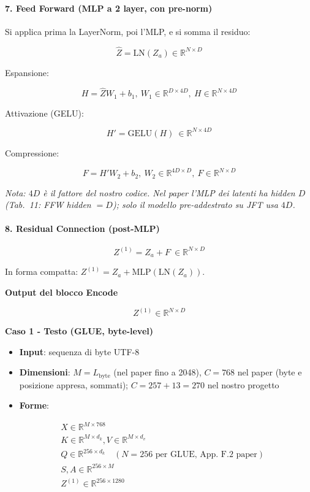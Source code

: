 \documentclass[
  11pt,
]{article}
\begin{document}
\paragraph{7. \textbf{Feed Forward (MLP a 2 layer, con pre-norm)}}

Si applica prima la LayerNorm, poi l'MLP, e si somma il residuo:

\[\widehat{Z} = \mathrm{LN}(Z_{a}) \in \mathbb{R}^{N \times D}\]

Espansione:

\[H = \widehat{Z}W_{1} + b_{1},\ W_{1} \in \mathbb{R}^{D \times 4D},\ H \in \mathbb{R}^{N \times 4D}\]

Attivazione (GELU):

\[H' = \mathrm{GELU}(H)\  \in \mathbb{R}^{N \times 4D}\]

Compressione:

\[F = H'W_{2} + b_{2},\ W_{2} \in \mathbb{R}^{4D \times D},\ F \in \mathbb{R}^{N \times D}\]

\emph{Nota: $4D$ è il fattore del nostro codice. Nel paper l'MLP dei latenti ha hidden $D$ (Tab.~11: FFW hidden $= D$); solo il modello pre-addestrato su JFT usa $4D$.}

\paragraph{8. \textbf{Residual Connection (post-MLP)}}

\[Z^{(1)} = Z_{a} + F\  \in \mathbb{R}^{N \times D}\]

In forma compatta: $Z^{(1)} = Z_{a} + \mathrm{MLP}(\mathrm{LN}(Z_{a}))$.

\textbf{Output del blocco Encode}

\[Z^{(1)} \in \mathbb{R}^{N \times D}\]

\textbf{Caso 1 - Testo (GLUE, byte-level)}

\begin{itemize}
\item
  \textbf{Input}: sequenza di byte UTF-8
\item
  \textbf{Dimensioni}: \(M = L_{\text{byte}}\) (nel paper fino a 2048),
  \(C = 768\) nel paper (byte e posizione appresa, sommati); \(C = 257 + 13 = 270\) nel nostro progetto
\item
  \textbf{Forme}:
\end{itemize}

\[\begin{matrix}
 & X \in \mathbb{R}^{M \times 768} \\
 & K \in \mathbb{R}^{M \times d_{k}},V \in \mathbb{R}^{M \times d_{v}} \\
 & Q \in \mathbb{R}^{256 \times d_{k}}\quad (N = 256 \text{ per GLUE, App.\ F.2 paper}) \\
 & S,A \in \mathbb{R}^{256 \times M} \\
 & Z^{(1)} \in \mathbb{R}^{256 \times 1280}
\end{matrix}\]
\end{document}
